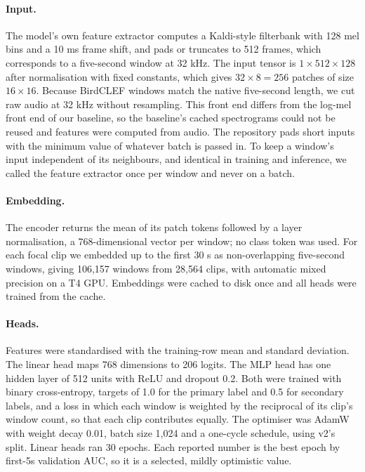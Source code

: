 \documentclass[letterpaper]{article} %
\begin{document}
\paragraph{Input.}
The model's own feature extractor computes a Kaldi-style filterbank with 128 mel bins and a 10 ms frame shift, and pads or truncates to 512 frames, which corresponds to a five-second window at 32 kHz. The input tensor is $1\times512\times128$ after normalisation with fixed constants, which gives $32\times8=256$ patches of size $16\times16$. Because BirdCLEF windows match the native five-second length, we cut raw audio at 32 kHz without resampling. This front end differs from the log-mel front end of our baseline, so the baseline's cached spectrograms could not be reused and features were computed from audio. The repository pads short inputs with the minimum value of whatever batch is passed in. To keep a window's input independent of its neighbours, and identical in training and inference, we called the feature extractor once per window and never on a batch.

\paragraph{Embedding.}
The encoder returns the mean of its patch tokens followed by a layer normalisation, a 768-dimensional vector per window; no class token was used. For each focal clip we embedded up to the first 30 s as non-overlapping five-second windows, giving 106,157 windows from 28,564 clips, with automatic mixed precision on a T4 GPU. Embeddings were cached to disk once and all heads were trained from the cache.

\paragraph{Heads.}
Features were standardised with the training-row mean and standard deviation. The linear head maps 768 dimensions to 206 logits. The MLP head has one hidden layer of 512 units with ReLU and dropout 0.2. Both were trained with binary cross-entropy, targets of 1.0 for the primary label and 0.5 for secondary labels, and a loss in which each window is weighted by the reciprocal of its clip's window count, so that each clip contributes equally. The optimiser was AdamW with weight decay 0.01, batch size 1,024 and a one-cycle schedule, using v2's split. Linear heads ran 30 epochs. Each reported number is the best epoch by first-5s validation AUC, so it is a selected, mildly optimistic value.
\end{document}
